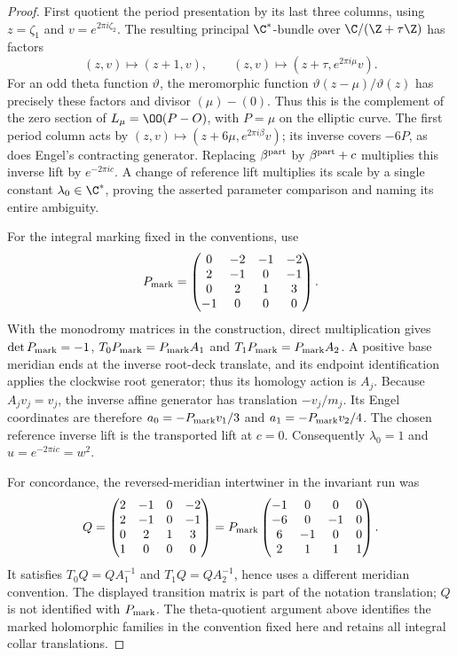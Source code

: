 \begin{proof}
First quotient the period presentation by its last three columns,
using $z=\zeta_1$ and $v=e^{2\pi i\zeta_2}$. The resulting principal
$\C^*$-bundle over $\C/(\Z+\tau\Z)$ has factors
\[
 (z,v)\mapsto(z+1,v),\qquad
 (z,v)\mapsto(z+\tau,e^{2\pi i\mu}v).
\]
For an odd theta function $\vartheta$, the meromorphic function
$\vartheta(z-\mu)/\vartheta(z)$ has precisely these factors and
divisor $(\mu)-(0)$. Thus this is the complement of the zero section
of $L_\mu=\OO(P-O)$, with $P=\mu$ on the elliptic curve. The first
period column acts by
$(z,v)\mapsto(z+6\mu,e^{2\pi i\beta}v)$; its inverse covers $-6P$,
as does Engel's contracting generator. Replacing $\beta^{\rm part}$
by $\beta^{\rm part}+c$ multiplies this inverse lift by
$e^{-2\pi i c}$. A change of reference lift multiplies its scale by
a single constant $\lambda_0\in\C^*$, proving the asserted parameter
comparison and naming its entire ambiguity.

For the integral marking fixed in the conventions, use
\[
 P_{\rm mark}=\begin{pmatrix}0&-2&-1&-2\\2&-1&0&-1\\0&2&1&3\\-1&0&0&0\end{pmatrix}.
\]
With the monodromy matrices in the construction, direct multiplication gives
$\det P_{\rm mark}=-1$, $T_0P_{\rm mark}=P_{\rm mark}A_1$ and
$T_1P_{\rm mark}=P_{\rm mark}A_2$. A positive base meridian ends at the
inverse root-deck translate, and its endpoint identification applies the
clockwise root generator; thus its homology action is $A_j$.
Because $A_jv_j=v_j$, the inverse affine generator has translation
$-v_j/m_j$. Its Engel coordinates are therefore
$a_0=-P_{\rm mark}v_1/3$ and $a_1=-P_{\rm mark}v_2/4$.
The chosen reference inverse lift is the transported lift at $c=0$.
Consequently $\lambda_0=1$ and $u=e^{-2\pi i c}=w^2$.

For concordance, the reversed-meridian intertwiner in the invariant run was
\[
 Q=\begin{pmatrix}2&-1&0&-2\\2&-1&0&-1\\0&2&1&3\\1&0&0&0\end{pmatrix}
   =P_{\rm mark}
 \begin{pmatrix}-1&0&0&0\\-6&0&-1&0\\6&-1&0&0\\2&1&1&1\end{pmatrix}.
\]
It satisfies $T_0Q=QA_1^{-1}$ and $T_1Q=QA_2^{-1}$, hence uses a
different meridian convention. The displayed transition matrix is part
of the notation translation; $Q$ is not identified with $P_{\rm mark}$.
The theta-quotient argument above identifies the marked holomorphic
families in the convention fixed here and retains all integral collar
translations.
\end{proof}

